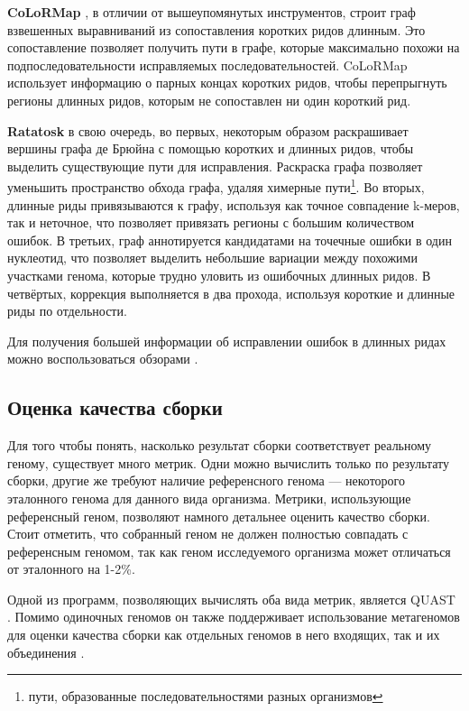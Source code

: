 \documentclass[14pt]{matmex-diploma-custom}
\begin{document}
\textbf{CoLoRMap} \cite{art:haghshenas2016colormap}, в отличии от вышеупомянутых инструментов, строит граф взвешенных выравниваний из сопоставления коротких ридов длинным. Это сопоставление позволяет получить пути в графе, которые максимально похожи на подпоследовательности исправляемых последовательностей. CoLoRMap использует информацию о парных концах коротких ридов, чтобы перепрыгнуть регионы длинных ридов, которым не сопоставлен ни один короткий рид.

\textbf{Ratatosk} \cite{art:holley2021ratatosk} в свою очередь, во первых, некоторым образом раскрашивает вершины графа де Брюйна с помощью коротких и длинных ридов, чтобы выделить существующие пути для исправления. Раскраска графа позволяет уменьшить пространство обхода графа, удаляя химерные пути\footnote{пути, образованные последовательностями разных организмов}.
Во вторых, длинные риды привязываются к графу, используя как точное совпадение k-меров, так и неточное, что позволяет привязать регионы с большим количеством ошибок. В третьих, граф аннотируется кандидатами на точечные ошибки в один нуклеотид, что позволяет выделить небольшие вариации между похожими участками генома, которые трудно уловить из ошибочных длинных ридов. В четвёртых, коррекция выполняется в два прохода, используя короткие и длинные риды по отдельности.

Для получения большей информации об исправлении ошибок в длинных ридах можно воспользоваться обзорами \cite{art:morisse2020long, art:zook2016extensive, art:zhang2020comprehensive}.

\subsection{Оценка качества сборки}
Для того чтобы понять, насколько результат сборки соответствует реальному геному, существует много метрик. Одни можно вычислить только по результату сборки, другие же требуют наличие референсного генома --- некоторого эталонного генома для данного вида организма. Метрики, использующие референсный геном, позволяют намного детальнее оценить качество сборки. Стоит отметить, что собранный геном не должен полностью совпадать с референсным геномом, так как геном исследуемого организма может отличаться от эталонного на 1-2\%.

Одной из программ, позволяющих вычислять оба вида метрик, является QUAST \cite{art:QUAST}. Помимо одиночных геномов он также поддерживает использование  метагеномов для оценки качества сборки как отдельных геномов в него входящих, так и их объединения \cite{art:metaquast}.
\end{document}

